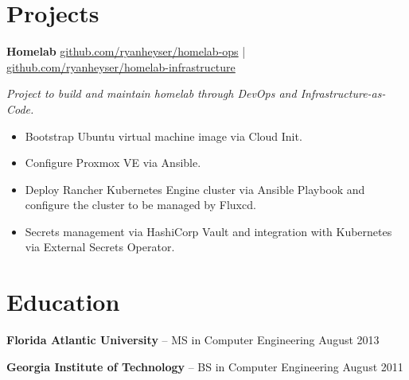 \documentclass[11pt]{article}       %
\begin{document}
\vspace{-18.5pt}
\section*{Projects}
\begin{description}
\item\textbf{Homelab} \hfill \href{https://github.com/ryanheyser/homelab-ops}{github.com/ryanheyser/homelab-ops} | \href{https://github.com/ryanheyser/homelab-infrastructure}{github.com/ryanheyser/homelab-infrastructure} \\
\item\textit{Project to build and maintain homelab through DevOps and Infrastructure-as-Code.} \\
\vspace{-6.5pt}
\begin{itemize}
  \item Bootstrap Ubuntu virtual machine image via Cloud Init.
  \item Configure Proxmox VE via Ansible.
  \item Deploy Rancher Kubernetes Engine cluster via Ansible Playbook and configure the cluster to be managed by Fluxcd.
  \item Secrets management via HashiCorp Vault and integration with Kubernetes via External Secrets Operator.
\end{itemize}
\end{description}

\vspace{-18.5pt}

\section*{Education}
\begin{description}
\item\textbf{Florida Atlantic University} -- MS in Computer Engineering \hfill August 2013
\vspace{-9.5pt}
\item\textbf{Georgia Institute of Technology} -- BS in Computer Engineering \hfill August 2011
\end{description}

\vspace{-18.5pt}
\end{document}
